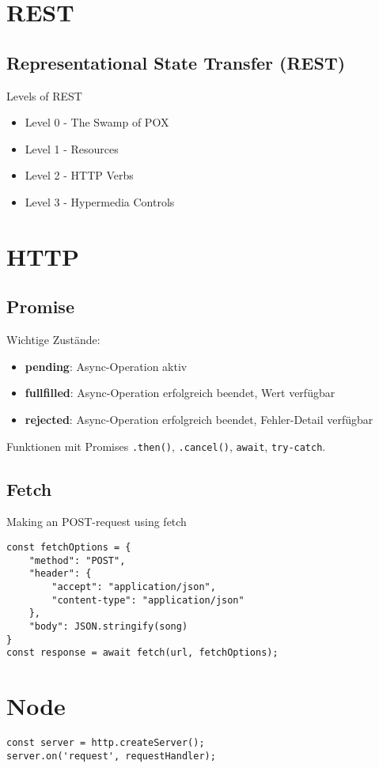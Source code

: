 \documentclass[11pt,twoside,landscape]{article}
\begin{document}
\begin{multicols*}{2}
\section{REST}
\subsection{Representational State Transfer (REST)}
Levels of REST
\begin{itemize}
\item Level 0 - The Swamp of POX
\item Level 1 - Resources
\item Level 2 - HTTP Verbs
\item Level 3 - Hypermedia Controls
\end{itemize}

\section{HTTP}
\subsection{Promise}
Wichtige Zustände:
\begin{itemize}
\item \textbf{pending}: Async-Operation aktiv
\item \textbf{fullfilled}: Async-Operation erfolgreich beendet, Wert verfügbar
\item \textbf{rejected}: Async-Operation erfolgreich beendet, Fehler-Detail verfügbar
\end{itemize}

Funktionen mit Promises \verb+.then()+, \verb+.cancel()+, \verb+await+, \verb+try-catch+.

\subsection{Fetch}
Making an POST-request using fetch
\begin{verbatim}
const fetchOptions = {
    "method": "POST",
    "header": {
        "accept": "application/json",
        "content-type": "application/json"
    },
    "body": JSON.stringify(song)
}
const response = await fetch(url, fetchOptions);
\end{verbatim}

\section{Node}
\begin{verbatim}
const server = http.createServer();
server.on('request', requestHandler);


\end{verbatim}
\end{multicols*}
\end{document}
